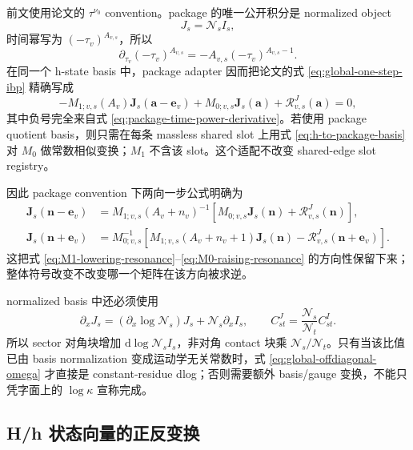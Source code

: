 \documentclass[11pt,a4paper]{ctexart}
\newcommand{\dd}{\mathrm d}
\newcommand{\cR}{\mathcal R}
\newcommand{\cN}{\mathcal N}
\begin{document}
前文使用论文的 $\tau^{\nu_0}$ convention。package 的唯一公开积分是 normalized object
\begin{equation}
 J_s=\cN_sI_s,
\end{equation}
时间幂写为 $(-\tau_v)^{A_{v,s}}$，所以
\begin{equation}
 \partial_{\tau_v}(-\tau_v)^{A_{v,s}}
 =-A_{v,s}(-\tau_v)^{A_{v,s}-1}.
 \label{eq:package-time-power-derivative}
\end{equation}
在同一个 h-state basis 中，package adapter 因而把论文的式 \eqref{eq:global-one-step-ibp} 精确写成
\begin{equation}
 -M_{1;v,s}(A_v)\bm J_s(\bm a-\bm e_v)
 +M_{0;v,s}\bm J_s(\bm a)
 +\cR^{J}_{v,s}(\bm a)=0,
 \label{eq:package-one-step-ibp}
\end{equation}
其中负号完全来自式 \eqref{eq:package-time-power-derivative}。若使用 package quotient basis，则只需在每条 massless shared slot 上用式 \eqref{eq:h-to-package-basis} 对 $M_0$ 做常数相似变换；$M_1$ 不含该 slot。这个适配不改变 shared-edge slot registry。

因此 package convention 下两向一步公式明确为
\begin{align}
 \bm J_s(\bm n-\bm e_v)
 &=M_{1;v,s}(A_v+n_v)^{-1}
 \left[M_{0;v,s}\bm J_s(\bm n)+\cR^J_{v,s}(\bm n)\right],
 \label{eq:package-lowering}\\
 \bm J_s(\bm n+\bm e_v)
 &=M_{0;v,s}^{-1}
 \left[M_{1;v,s}(A_v+n_v+1)\bm J_s(\bm n)
 -\cR^J_{v,s}(\bm n+\bm e_v)\right].
 \label{eq:package-raising}
\end{align}
这把式 \eqref{eq:M1-lowering-resonance}--\eqref{eq:M0-raising-resonance} 的方向性保留下来；整体符号改变不改变哪一个矩阵在该方向被求逆。

normalized basis 中还必须使用
\begin{equation}
 \partial_xJ_s
 =(\partial_x\log\cN_s)J_s+\cN_s\partial_xI_s,
 \qquad
 C^{J}_{st}=\frac{\cN_s}{\cN_t}C^{I}_{st}.
 \label{eq:normalization-adapter}
\end{equation}
所以 sector 对角块增加 $\dd\log\cN_sI_s$，非对角 contact 块乘 $\cN_s/\cN_t$。只有当该比值已由 basis normalization 变成运动学无关常数时，式 \eqref{eq:global-offdiagonal-omega} 才直接是 constant-residue dlog；否则需要额外 basis/gauge 变换，不能只凭字面上的 $\log\kappa$ 宣称完成。

\subsection{H/h 状态向量的正反变换}
\end{document}
